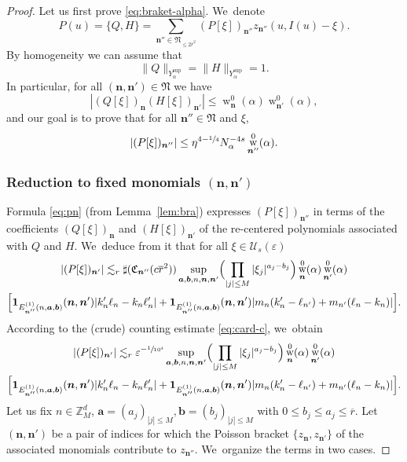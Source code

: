 \documentclass[JEP,XML,SOM,Unicode,published]{cedram}
\DeclareMathOperator{\rw}{w}
\theoremstyle{plain}
\theoremstyle{definition}
\newcommand{\nb}{{\boldsymbol n}}
\newcommand{\Nb}{{\boldsymbol{\mathfrak{N}}}}
\newcommand{\Z}{\mathbb{Z}}
\newcommand{\1}{\mathbf{1}}
\newcommand{\Ysup}[1]{Y_{#1}^{\mathrm{sup}}}
\let\epsilon\varepsilon
\begin{document}
\begin{proof}
Let us first prove \eqref{eq:braket-alpha}. We~denote
\[
P(u) = \{Q,H\} = \sum_{\nb''\in\Nb_{\leq2\overline{r}^{2}}}(P[\xi])_{\nb''}z_{\nb''}(u,I(u)-\xi).
\]
By homogeneity we can assume that
\[
\|Q\|_{\Ysup{\alpha}} = \|H\|_{\Ysup{\alpha}} =1.
\]
In particular, for all $(\nb,\nb')\in\Nb$ we have
\[
|(Q[\xi])_{\nb}(H[\xi])_{\nb'}| \leq \rw_{\nb}^{0}(\alpha)\rw_{\nb'}^{0}(\alpha),
\]
and our goal is to prove that for all $\nb''\in\Nb$ and $\xi$,
\[
|(P[\xi])_{\nb''}|
\leq
\eta^{4-\sfrac{1}{4}}
N_{\alpha}^{-4s}
\rw_{\nb''}^{0}(\alpha).
\]
\subsubsection*{Reduction to fixed monomials $(\nb,\nb')$} Formula \eqref{eq:pn} (from Lemma~\ref{lem:bra}) expresses $(P[\xi])_{\nb''}$ in terms of the coefficients $(
Q[\xi])_{\nb}$ and $(H[\xi])_{\nb'}$ of the re-centered polynomials associated with $Q$ and $H$. We~deduce from it that for all $\xi\in\mathcal{U}_{s}(\epsilon)$
\begin{multline*}
|(P[\xi])_{\nb'}| \lesssim_{ r}\sharp(\mathfrak{C}_{\nb''}(c\overline{r}^{2}))
\sup_{\boldsymbol{a},\boldsymbol{b},n,\nb,\nb'}
\Bigl(\prod_{|j|\leq M}|\xi_{j}|^{a_{j}-b_{j}}\Bigr)
\rw_{\nb}^{0}(\alpha)\rw_{\nb'}^{0}(\alpha)
\\
\Big[\mathbf{1}_{E_{\nb''}^{(1)}(n,\boldsymbol{a},\boldsymbol{b})}(\nb,\nb')
|k_{n}'\ell_{n}-k_{n}\ell_{n}'|
+\mathbf{1}_{E_{\nb''}^{(1)}(n,\boldsymbol{a},\boldsymbol{b})}(\nb,\nb')
|m_{n}(k_{n}'-\ell_{n'})+m_{n'}(\ell_{n}-k_{n})|
\Big].
\end{multline*}
According to the (crude) counting estimate \eqref{eq:card-c}, we~obtain
\begin{multline}
|(P[\xi])_{\nb'}|\lesssim_{r}\epsilon^{-\sfrac{1}{10^{4}}}
\sup_{\boldsymbol{a},\boldsymbol{b},n,\nb,\nb'}
\Bigl(\prod_{|j|\leq M}|\xi_{j}|^{a_{j}-b_{j}}\Bigr)\rw_{\nb}^{0}(\alpha)\rw_{\nb'}^{0}(\alpha) \\
\Big[\mathbf{1}_{E_{\nb''}^{(1)}(n,\boldsymbol{a},\boldsymbol{b})}(\nb,\nb')
|k_{n}'\ell_{n}-k_{n}\ell_{n}'|
+\mathbf{1}_{E_{\nb''}^{(1)}(n,\boldsymbol{a},\boldsymbol{b})}(\nb,\nb')
|m_{n}(k_{n}'-\ell_{n'})+m_{n'}(\ell_{n}-k_{n})|
\Big].
\label{eq:pogi}
\end{multline}
Let us fix $n\in\Z_{M}^{d}$, $\boldsymbol{a}=(a_{j})_{|j|\leq M}, \boldsymbol{b} = (b_{j})_{|j|\leq M}$ with $0\leq b_{j}\leq a_{j}\leq \overline{r}$. Let $(\nb,\nb')$ be a pair of indices for which the Poisson bracket $\{z_{\nb},z_{\nb'}\}$ of the associated monomials contribute to $z_{\nb''}$. We~organize the terms in two cases.


\end{proof}
\end{document}
